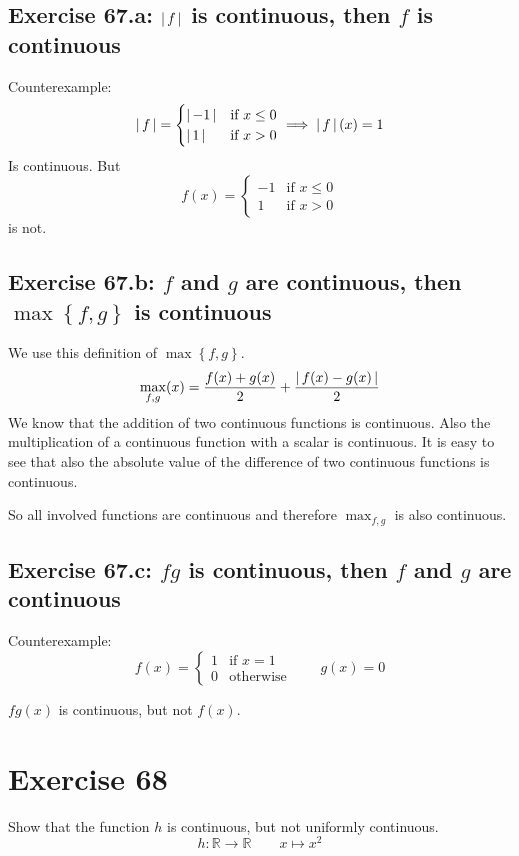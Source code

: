 \documentclass[a4paper]{article}
\theoremstyle{definition}
\newcommand\abs[1]{\left|\thinspace #1\thinspace\right|}
\newcommand\set[1]{\left\{#1\right\}}
\begin{document}
\subsection{Exercise 67.a: $\abs{f}$ is continuous, then $f$ is continuous}
%
Counterexample:
\[
  \abs{f} = \begin{cases}
    \abs{-1} & \text{if } x \leq 0 \\
    \abs{1} & \text{if } x > 0
  \end{cases}
  \implies \abs{f}(x) = 1
\]
Is continuous. But
\[
  f(x) = \begin{cases}
    -1 & \text{if } x \leq 0 \\
    1 & \text{if } x > 0
  \end{cases}
\]
is not.

\subsection{Exercise 67.b: $f$ and $g$ are continuous, then $\max\set{f, g}$ is continuous}
%
We use this definition of $\max\set{f, g}$.
\[
  \max_{f,g}(x) =
    \frac{f(x) + g(x)}{2} + \frac{\abs{f(x) - g(x)}}{2}
\]
We know that the addition of two continuous functions is continuous.
Also the multiplication of a continuous function with a scalar is continuous.
It is easy to see that also the absolute value of the difference of two continuous
functions is continuous.

So all involved functions are continuous and therefore $\max_{f,g}$ is also continuous.

\subsection{Exercise 67.c: $fg$ is continuous, then $f$ and $g$ are continuous}
%
Counterexample:
\[
  f(x) = \begin{cases}
    1 & \text{if } x = 1 \\
    0 & \text{otherwise}
  \end{cases}
  \qquad
  g(x) = 0
\]

$fg(x)$ is continuous, but not $f(x)$.

\section{Exercise 68}
\begin{ex}
  Show that the function $h$ is continuous, but not uniformly continuous.
  \[ h: \mathbb R \to \mathbb R \qquad x \mapsto x^2 \]
\end{ex}
\end{document}
